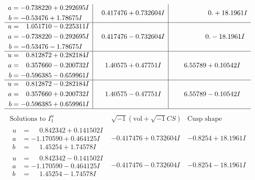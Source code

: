 \documentclass[1p]{elsarticle_modified}
\theoremstyle{definition}
\newcommand{\I}{\sqrt{-1}}
\begin{document}
$$\begin{array}{c|c|c}
\begin{aligned}
a &= -0.738220 + 0.292695 I \\
b &= -0.53476 + 1.78675 I\end{aligned}
 & \phantom{-}0.417476 + 0.732604 I & \phantom{-0.000000 -}0. + 18.1961 I \\ \hline\begin{aligned}
u &= \phantom{-}1.051710 - 0.225311 I \\
a &= -0.738220 - 0.292695 I \\
b &= -0.53476 - 1.78675 I\end{aligned}
 & \phantom{-}0.417476 - 0.732604 I & \phantom{-0.000000 } 0. - 18.1961 I \\ \hline\begin{aligned}
u &= \phantom{-}0.812872 + 0.282184 I \\
a &= \phantom{-}0.357660 - 0.200732 I \\
b &= -0.596385 - 0.659961 I\end{aligned}
 & \phantom{-}1.40575 + 0.47751 I & \phantom{-}6.55789 + 0.10542 I \\ \hline\begin{aligned}
u &= \phantom{-}0.812872 - 0.282184 I \\
a &= \phantom{-}0.357660 + 0.200732 I \\
b &= -0.596385 + 0.659961 I\end{aligned}
 & \phantom{-}1.40575 - 0.47751 I & \phantom{-}6.55789 - 0.10542 I\\
 \hline 
 \end{array}$$\newpage$$\begin{array}{c|c|c}  
\text{Solutions to }I^u_{1}& \I (\text{vol} + \sqrt{-1}CS) & \text{Cusp shape}\\
 \hline 
\begin{aligned}
u &= \phantom{-}0.842342 + 0.141502 I \\
a &= -1.170590 + 0.464125 I \\
b &= \phantom{-}1.45254 + 1.74578 I\end{aligned}
 & -0.417476 + 0.732604 I & -0.8254 + 18.1961 I \\ \hline\begin{aligned}
u &= \phantom{-}0.842342 - 0.141502 I \\
a &= -1.170590 - 0.464125 I \\
b &= \phantom{-}1.45254 - 1.74578 I\end{aligned}
 & -0.417476 - 0.732604 I & -0.8254 - 18.1961 I \\ \hline\begin{aligned}

\end{aligned}
\end{array}$$
\end{document}
